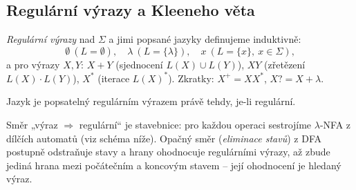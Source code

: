 \documentclass[11pt,a4paper]{article}
\begin{document}
\subsection{Regulární výrazy a Kleeneho věta}

\begin{definice}
\emph{Regulární výrazy} nad $\Sigma$ a jimi popsané jazyky definujeme induktivně:
\[ \emptyset\ (L=\emptyset),\quad \lambda\ (L=\{\lambda\}),\quad x\ (L=\{x\},\ x\in\Sigma), \]
a pro výrazy $X,Y$: $X+Y$ (sjednocení $L(X)\cup L(Y)$), $XY$ (zřetězení $L(X)\cdot L(Y)$), $X^*$ (iterace $L(X)^*$). Zkratky: $X^+=XX^*$, $X?=X+\lambda$.
\end{definice}

\begin{veta}[Kleeneho]
Jazyk je popsatelný regulárním výrazem právě tehdy, je-li regulární.
\end{veta}

\begin{intuice}
Směr „výraz $\Rightarrow$ regulární`` je stavebnice: pro každou operaci sestrojíme $\lambda$-NFA z dílčích automatů (viz schéma níže). Opačný směr (\emph{eliminace stavů}) z DFA postupně odstraňuje stavy a hrany ohodnocuje regulárními výrazy, až zbude jediná hrana mezi počátečním a koncovým stavem -- její ohodnocení je hledaný výraz.
\end{intuice}
\end{document}
